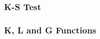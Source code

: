 \documentclass[
]{article}
\newenvironment{Shaded}{\begin{snugshade}}{\end{snugshade}}
\newcommand{\CommentTok}[1]{\textcolor[rgb]{0.56,0.35,0.01}{\textit{#1}}}
\newcommand{\FunctionTok}[1]{\textcolor[rgb]{0.00,0.00,0.00}{#1}}
\newcommand{\NormalTok}[1]{#1}
\newcommand{\SpecialCharTok}[1]{\textcolor[rgb]{0.00,0.00,0.00}{#1}}
\begin{document}
\hypertarget{k-s-test}{%
\subsubsection{K-S Test}\label{k-s-test}}

\begin{Shaded}
\end{Shaded}

\hypertarget{k-l-and-g-functions}{%
\subsubsection{K, L and G Functions}\label{k-l-and-g-functions}}
\end{document}
